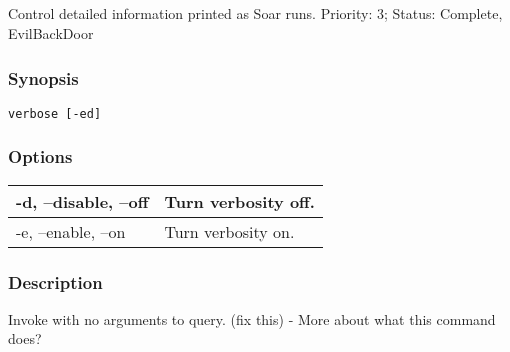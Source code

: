 \subsection{}
\label{verbose}
Control detailed information printed as Soar runs. 
 Priority: 3; Status: Complete, EvilBackDoor
\subsubsection*{Synopsis}
\begin{verbatim}
verbose [-ed]
\end{verbatim}
\subsubsection*{Options}
\begin{tabular}{|l|l|}
\hline 
 -d, --disable, --off  & Turn verbosity off.  \\
 \hline 
 -e, --enable, --on  & Turn verbosity on.  \\
 \hline 
\end{tabular}
\subsubsection*{Description}
 Invoke with no arguments to query. (fix this) - More about what this command does? 
